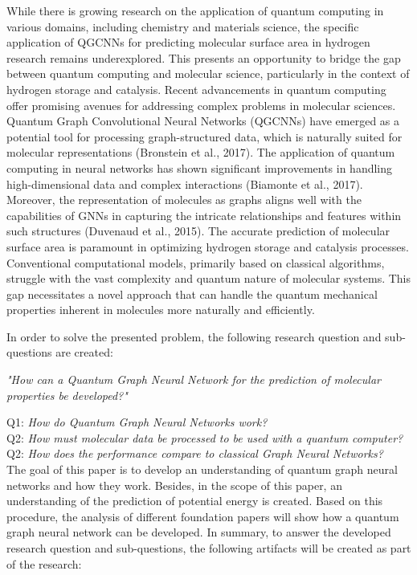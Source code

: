 While there is growing research on the application of quantum computing in various domains, including chemistry and materials science, the specific application of QGCNNs for predicting molecular surface area in hydrogen research remains underexplored. This presents an opportunity to bridge the gap between quantum computing and molecular science, particularly in the context of hydrogen storage and catalysis. Recent advancements in quantum computing offer promising avenues for addressing complex problems in molecular sciences. Quantum Graph Convolutional Neural Networks (QGCNNs) have emerged as a potential tool for processing graph-structured data, which is naturally suited for molecular representations (Bronstein et al., 2017). The application of quantum computing in neural networks has shown significant improvements in handling high-dimensional data and complex interactions (Biamonte et al., 2017). Moreover, the representation of molecules as graphs aligns well with the capabilities of GNNs in capturing the intricate relationships and features within such structures (Duvenaud et al., 2015). The accurate prediction of molecular surface area is paramount in optimizing hydrogen storage and catalysis processes. Conventional computational models, primarily based on classical algorithms, struggle with the vast complexity and quantum nature of molecular systems. This gap necessitates a novel approach that can handle the quantum mechanical properties inherent in molecules more naturally and efficiently.

In order to solve the presented problem, the following research question and sub-questions are created: 
\begin{center}
    \textit{"How can a Quantum Graph Neural Network for the prediction of molecular properties be developed?"} \\
\end{center}
Q1: \textit{How do Quantum Graph Neural Networks work?} \\
Q2: \textit{How must molecular data be processed to be used with a quantum computer?} \\
Q2: \textit{How does the performance compare to classical Graph Neural Networks?} \\

The goal of this paper is to develop an understanding of quantum graph neural networks and how they work. Besides, in the scope of this paper, an understanding of the prediction of potential energy is created. Based on this procedure, the analysis of different foundation papers  will show how a quantum graph neural network can be developed. In summary, to answer the developed research question and sub-questions, the following artifacts will be created as part of the research: 

